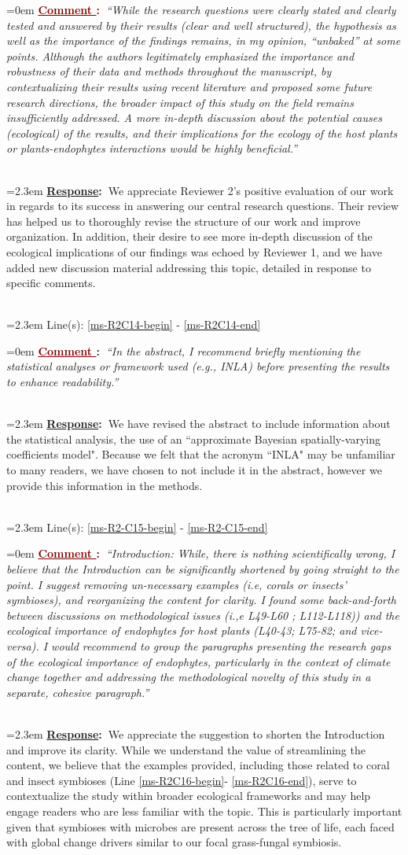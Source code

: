 \documentclass[12pt]{article}
\newcounter{cN}
\newcommand{\comment}[1]{
	\vspace{2em}
	\refstepcounter{cN} %
	\noindent \hangindent=0em \textbf{\textcolor{Maroon}{\uline{Comment \thecN}:~}}\emph{``#1''}
	}
\newcommand{\response}[1]{
	\\[0.25em]
	\hangindent=2.3em \textbf{\textcolor{NavyBlue}{\uline{Response}:~}}#1
	}
\newcommand{\linesref}[2]{
		\\[0.25em]
	\hangindent=2.3em {\color{Mahogany} Line(s): \ref{#1} - \ref{#2}}
}
\begin{document}
\comment{While the research questions were clearly stated and clearly tested and answered by their results (clear and well structured), the hypothesis as well as the importance of the findings remains, in my opinion, “unbaked” at some points. Although the authors legitimately emphasized the importance and robustness of their data and methods throughout the manuscript, by contextualizing their results using recent literature and proposed some future research directions, the broader impact of this study on the field remains insufficiently addressed. A more in-depth discussion about the potential causes (ecological) of the results, and their implications for the ecology of the host plants or plants-endophytes interactions would be highly beneficial.}
\response{We appreciate Reviewer 2's positive evaluation of our work in regards to its success in answering our central research questions. Their review has helped us to thoroughly revise the structure of our work and improve organization. In addition, their desire to see more in-depth discussion of the ecological implications of our findings was echoed by Reviewer 1, and we have added new discussion material addressing this topic, detailed in response to specific comments.}
\linesref{ms-R2C14-begin}{ms-R2C14-end}


\comment{In the abstract, I recommend briefly mentioning the statistical analyses or framework used (e.g., INLA) before presenting the results to enhance readability.}
\response{We have revised the abstract to include information about the statistical analysis, the use of an ``approximate Bayesian spatially-varying coefficients model". Because we felt that the acronym ``INLA" may be unfamiliar to many readers, we have chosen to not include it in the abstract, however we provide this information in the methods.}
\linesref{ms-R2-C15-begin}{ms-R2-C15-end}

\comment{Introduction: While, there is nothing scientifically wrong, I believe that the Introduction can be significantly shortened by going straight to the point. I suggest removing un-necessary examples (i.e, corals or insects’ symbioses), and reorganizing the content for clarity. I found some back-and-forth between discussions on methodological issues (i.,e L49-L60 ; L112-L118)) and the ecological importance of endophytes for host plants (L40-43; L75-82; and vice-versa). I would recommend to group the paragraphs presenting the research gaps of the ecological importance of endophytes, particularly in the context of climate change together and addressing the methodological novelty of this study in a separate, cohesive paragraph.}
\response{We appreciate the suggestion to shorten the  Introduction and improve its clarity. While we understand the value of streamlining the content, we believe that the examples provided, including those related to coral and insect symbioses (Line \ref{ms-R2C16-begin}- \ref{ms-R2C16-end}), serve to contextualize the study within broader ecological frameworks and may help engage readers who are less familiar with the topic. This is particularly important given that symbioses with microbes are present across the tree of life, each faced with global change drivers similar to our focal grass-fungal symbiosis.}
\end{document}
